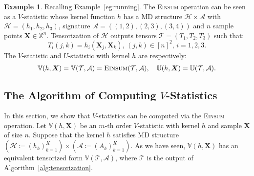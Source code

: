 \documentclass[sn-mathphys, natbib=false]{sn-jnl}
\newcommand{\pdfv}{\texorpdfstring{$V$}{V}}
\theoremstyle{plain}
\theoremstyle{definition}
\newtheorem{subexample}{Example}
\def\Einsum{\textsc{Einsum}}
\newcommand{\ustat}{\mathbb{U}}
\newcommand{\vstat}{\mathbb{V}}
\newcommand{\samplespace}{\bbX}
\newcommand{\bbR}{{\mathbb{R}}}
\def\bbX{\mathbb{X}}
\def\calA{\mathcal{A}}
\def\calT{\mathcal{T}}
\def\calH{\mathcal{H}}
\begin{document}
\begin{bibunit}[agsm]
\setcounter{example}{1}
\begin{subexample}
\label{eg:running-a}
Recalling Example~\ref{eg:running}. The \Einsum{} operation can be seen as a $V$-statistic whose kernel function $h$ has a MD structure $\calH \times \calA$ with $\calH = (h_1, h_2, h_3)$, signature $\calA = ( (1,2),(2,3),(3,4))$ and $n$ sample points $\bm{X} \in \samplespace^{n}$. Tensorization of $\calH$ outputs tensors $\calT = ( T_1, T_2, T_3)$ such that:
\begin{equation*}
T_i (j,k) = h_i (\bm{X}_{j}, \bm{X}_{k}),  \, (j,k) \in [n]^2,  \, i = 1,2,3.
\end{equation*}
The $V$-statistic and $U$-statistic with kernel $h$ are respectively:
\begin{align*}
\vstat(h, \bm{X}) = \vstat (\calT, \calA) = \Einsum{}(\calT, \calA), \quad \ustat(h, \bm{X}) = \ustat(\calT, \calA).
\end{align*}
\end{subexample}

\subsection{The Algorithm of Computing \pdfv{}-Statistics}
\label{sec:alg_v}

In this section, we show that $V$-statistics can be computed via the \Einsum{} operation. Let $\vstat(h, \bm{X})$ be an $m$-th order $V$-statistic with kernel $h$ and sample $\bm{X}$ of size $n$. Suppose that the kernel $h$ satisfies MD structure $(\calH \coloneqq (h_k)_{k=1}^K) \times (\calA \coloneqq (A_k)_{k=1}^K)$. As we have seen, $\vstat(h, \bm{X})$ has an equivalent tensorized form $\vstat(\calT, \calA)$, where $\calT$ is the output of Algorithm~\ref{alg:tensorization}. 


\end{bibunit}
\end{document}
